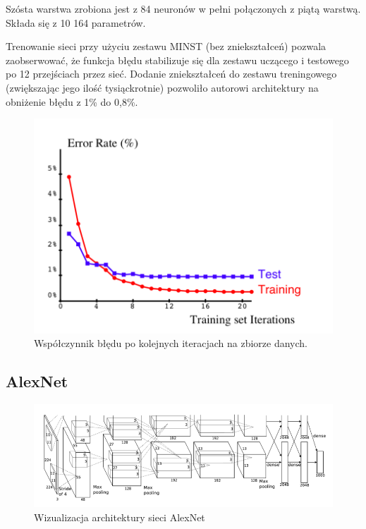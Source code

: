 \documentclass[12pt,a4paper,twoside,titlepage,openright]{book}
\begin{document}
Szósta warstwa zrobiona jest z 84 neuronów w pełni połączonych z piątą warstwą. Składa się z 10 164 parametrów.

Trenowanie sieci przy użyciu zestawu MINST (bez zniekształceń) pozwala zaobserwować, że funkcja błędu stabilizuje się dla zestawu uczącego i testowego po 12 przejściach przez sieć. Dodanie zniekształceń do zestawu treningowego (zwiększając jego ilość tysiąckrotnie) pozwoliło autorowi architektury na obniżenie błędu z 1\% do 0,8\%.

\begin{figure}[ht]
	\centering
			\includegraphics[resolution=100, scale=0.45]{leNetTraining.png}
		\caption{Współczynnik błędu po kolejnych iteracjach na zbiorze danych.}
\end{figure}


\subsection{AlexNet}
\begin{figure}[ht]
	\centering
			\includegraphics[resolution=100, scale=0.65]{AlexNet.png}
		\caption{Wizualizacja architektury sieci AlexNet}
\end{figure}
\end{document}
